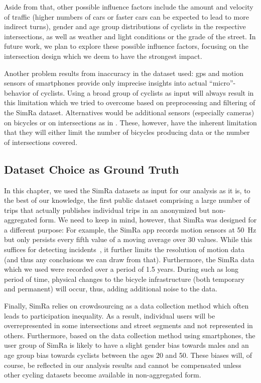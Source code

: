 Aside from that, other possible influence factors include the amount and velocity of traffic (higher numbers of cars or faster cars can be expected to lead to more indirect turns), gender and age group distributions of cyclists in the respective intersections, as well as weather and light conditions or the grade of the street.
In future work, we plan to explore these possible influence factors, focusing on the intersection design which we deem to have the strongest impact.

Another problem results from inaccuracy in the dataset used:
\ac{gps} and motion sensors of smartphones provide only imprecise insights into actual ``micro''-behavior of cyclists.
Using a broad group of cyclists as input will always result in this limitation which we tried to overcome based on preprocessing and filtering of the SimRa dataset.
Alternatives would be additional sensors (especially cameras) on bicycles or on intersections as in \cite{kaths2016integration}.
These, however, have the inherent limitation that they will either limit the number of bicycles producing data or the number of intersections covered.

\subsection{Dataset Choice as Ground Truth}
\label{subsec:dataset_choice_as_ground_truth}
In this chapter, we used the SimRa datasets as input for our analysis as it is, to the best of our knowledge, the first public dataset comprising a large number of trips that actually publishes individual trips in an anonymized but non-aggregated form.
We need to keep in mind, however, that SimRa was designed for a different purpose:
For example, the SimRa app records motion sensors at \SI{50}{\hertz} but only persists every fifth value of a moving average over 30 values.
While this suffices for detecting incidents~\cite{karakaya2020simra}, it further limits the resolution of motion data (and thus any conclusions we can draw from that).
Furthermore, the SimRa data which we used were recorded over a period of 1.5 years.
During such as long period of time, physical changes to the bicycle infrastructure (both temporary and permanent) will occur, thus, adding additional noise to the data.

Finally, SimRa relies on crowdsourcing as a data collection method which often leads to participation inequality.
As a result, individual users will be overrepresented in some intersections and street segments and not represented in others.
Furthermore, based on the data collection method using smartphones, the user group of SimRa is likely to have a slight gender bias towards males and an age group bias towards cyclists between the ages \num{20} and \num{50}.
These biases will, of course, be reflected in our analysis results and cannot be compensated unless other cycling datasets become available in non-aggregated form.

